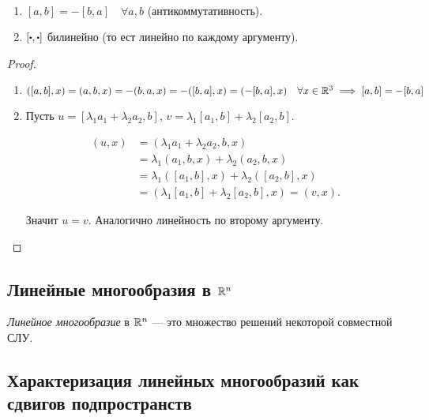 \begin{proposal}~
    \begin{enumerate}
    \item $[a, b] = -[b, a] \quad \forall a, b$ (антикоммутативность).
    \item $[\bigcdot, \bigcdot]$ билинейно (то ест линейно по каждому аргументу).
    \end{enumerate}
\end{proposal}

\begin{proof}~
    \begin{enumerate}
    \item 
        $([a, b], x) = (a, b, x) = -(b, a, x) = -([b, a], x) = (-[b, a], x) \quad \forall x \in \mathbb{R}^3 \implies [a, b] = -[b, a]$

    \item
        Пусть $u = [\lambda_1 a_1 + \lambda_2 a_2, b]$, $v = \lambda_1 [a_1, b] + \lambda_2 [a_2, b]$.

        \begin{align*}
            (u, x) &= (\lambda_1 a_1 + \lambda_2 a_2, b, x) \\
                   &= \lambda_1 (a_1, b, x) + \lambda_2 (a_2, b, x) \\
                   &= \lambda_1 ([a_1, b], x) + \lambda_2([a_2, b], x) \\
                   &= (\lambda_1[a_1, b] + \lambda_2[a_2, b], x) = (v, x)
        .\end{align*}

        Значит $u = v$. Аналогично линейность по второму аргументу.
        \qedhere
    \end{enumerate}
\end{proof}


\subsection{Линейные многообразия в $\mathbb{R}^n$}

\begin{definition}
    \textit{Линейное многообразие} в $\mathbb{R}^n$ --- это множество решений некоторой совместной СЛУ.
\end{definition}


\subsection{Характеризация линейных многообразий как сдвигов подпространств}

